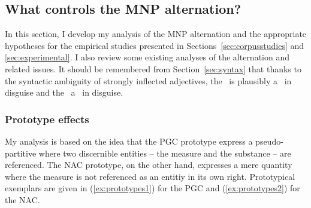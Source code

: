 \subsection{What controls the MNP alternation?}
\label{sec:analyses}

In this section, I develop my analysis of the MNP alternation and the appropriate hypotheses for the empirical studies presented in Sections~\ref{sec:corpusstudies} and \ref{sec:experimental}.
I also review some existing analyses of the alternation and related issues.
It should be remembered from Section~\ref{sec:syntax} that thanks to the syntactic ambiguity of strongly inflected adjectives, the \PGCa\ is plausibly a \PGCd\ in disguise and the \NACa\ a \NACb\ in disguise.

\subsubsection{Prototype effects}
\label{sec:prototypeeffects}

My analysis is based on the idea that the PGC prototype express a pseudo-partitive where two discernible entities -- the measure and the substance -- are referenced.
The NAC prototype, on the other hand, expresses a mere quantity where the measure is not referenced as an entitiy in its own right.
Prototypical exemplars are given in (\ref{ex:prototypes1}) for the PGC and (\ref{ex:prototypes2}) for the NAC.

\begin{exe}
  \ex\label{ex:prototypes} 
  \begin{xlist}
  \end{xlist}
\end{exe}

